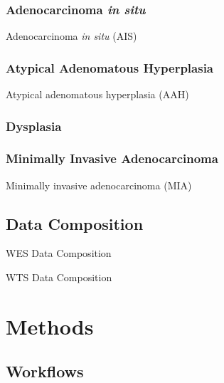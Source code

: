 \documentclass[11pt,a4paper,onecolumn,oneside]{report}
\begin{document}
            \subsubsection{Adenocarcinoma \textit{in situ}}
                Adenocarcinoma \textit{in situ} (AIS)

            \subsubsection{Atypical Adenomatous Hyperplasia}
                Atypical adenomatous hyperplasia (AAH)

            \subsubsection{Dysplasia}

            \subsubsection{Minimally Invasive Adenocarcinoma}
                Minimally invasive adenocarcinoma (MIA)

        \subsection{Data Composition}
            \begin{table}[p]
                \centering
                \label{tb:WES-composition}
                \caption{WES Data Composition}
                
            \end{table}

            \begin{table}[p]
                \centering
                \label{tb:WTS-composition}
                \caption{WTS Data Composition}
                
            \end{table}
    \newpage

    \section{Methods}
        \subsection{Workflows}
\end{document}
